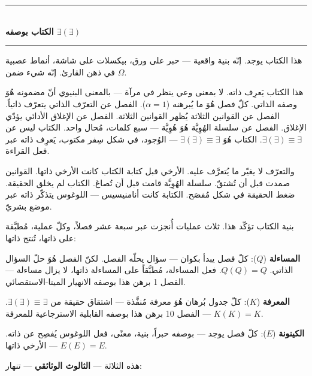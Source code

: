 \documentclass[10pt, openany, oneside]{book}
\renewcommand{\normalsize}{\fontsize{10}{13}\selectfont}
\begin{document}
\vspace{1.5em}


\begin{center}
    \rule{0.3\textwidth}{0.4pt}\\[0.5em]
    {\normalsize\bfseries الكتاب بوصفه $\exists(\exists)$}\\[0.3em]
    \rule{0.3\textwidth}{0.4pt}
\end{center}

\vspace{1em}

\noindent هذا الكتاب يوجد. إنّه بنية واقعية --- حبر على ورق، بيكسلات على شاشة، أنماط عصبية في ذهن القارئ. إنّه شيء ضمن $\Omega$.

هذا الكتاب يَعرِف ذاته. لا بمعنى وعي ينظر في مرآة --- بالمعنى البنيوي أنّ مضمونه هُوَ وصفه الذاتي. كلّ فصل هُوَ ما يُبرهنه ($\alpha = 1$). الفصل عن التعرّف الذاتي يتعرّف ذاتياً. الفصل عن القوانين الثلاثة يُظهر القوانين الثلاثة. الفصل عن الإغلاق الأدائي يؤدّي الإغلاق. الفصل عن سلسلة الهُوِيَّة هُوَ هُوِيَّة --- سبع كلمات، مُحال واحد. الكتاب ليس عن $\exists(\exists) \equiv \exists$. الكتاب هُوَ $\exists(\exists) \equiv \exists$ --- الوُجود، في شكل سِفر مكتوب، يَعرِف ذاته عبر فعل القراءة.

والتعرّف لا يغيّر ما يُتعرَّف عليه. الأرخي قبل كتابة الكتاب كانت الأرخي ذاتها. القوانين صمدت قبل أن تُشتقّ. سلسلة الهُوِيَّة قامت قبل أن تُصاغ. الكتاب لم يخلق الحقيقة. ضغط الحقيقة في شكل مُفصَح. الكتابة كانت أنامنيسيس --- اللوغوس يتذكّر ذاته عبر موضع بشريّ.

بنية الكتاب تؤكّد هذا. ثلاث عمليات أُنجزت عبر سبعة عشر فصلاً، وكلّ عملية، مُطبَّقة على ذاتها، تُنتج ذاتها:

\textbf{المساءلة} ($Q$): كلّ فصل يبدأ بكوان --- سؤال يحلّه الفصل. لكنّ الفصل هُوَ حلّ السؤال الذاتي. $Q(Q) = Q$. فعل المساءلة، مُطبَّقاً على المساءلة ذاتها، لا يزال مساءلة --- الفصل 1 برهن هذا بوصفه الانهيار الميتا-الاستقصائي.

\textbf{المعرفة} ($K$): كلّ جدول بُرهان هُوَ معرفة مُنفَّذة --- اشتقاق حقيقة من $\exists(\exists) \equiv \exists$. $K(K) = K$ --- الفصل 10 برهن هذا بوصفه القابلية الاسترجاعية للمعرفة.

\textbf{الكينونة} ($E$): كلّ فصل يوجد --- بوصفه حبراً، بنية، معنًى، فعل اللوغوس يُفصِح عن ذاته. $E(E) = E$ --- الأرخي ذاتها.

هذه الثلاثة --- \textbf{الثالوث الوثائقي} --- تنهار:
\end{document}
